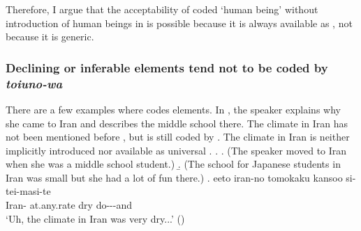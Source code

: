 Therefore,
I argue that the acceptability of  coded `human being' without introduction of human beings in \LLast is possible
because it is always available as ,
not because it is generic.


\subsubsection{Declining or inferable elements tend not to be coded by \textit{toiuno-wa}}\label{Toiuno-waInfSemiActUnuse}

There are a few examples
where  codes  elements.
In \Next,
the speaker explains why she came to Iran and describes the middle school there.
The climate in Iran has not been mentioned before \Next[c],
but is still coded by .
The climate in Iran is neither implicitly introduced nor available as universal .
\ex. \label{IranClimate}
 \a. (The speaker moved to Iran when she was a middle school student.)
 \b. (The school for Japanese students in Iran was small but she had a lot of fun there.)
 \bg. eeto iran-no  tomokaku kansoo si-tei-masi-te \\
 	 Iran-  at.any.rate dry do---and \\
	`Uh, the climate in Iran was very dry...'
	\hfill{()}
%

